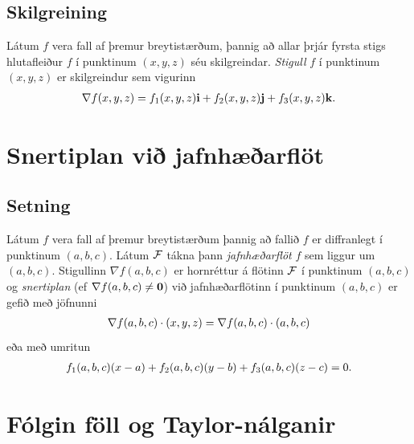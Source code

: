 \documentclass[a4paper,10pt,icelandic]{sphinxmanual}
\begin{document}
\subsection{Skilgreining}
\label{Kafli2:id51}
Látum \(f\) vera fall af þremur breytistærðum, þannig að allar þrjár
fyrsta stigs hlutafleiður \(f\) í punktinum \((x,y,z)\) séu
skilgreindar. \textit{Stigull} \(f\) í punktinum \((x,y,z)\) er
skilgreindur sem vigurinn
\begin{gather}
\begin{split}\displaystyle \nabla f(x,y,z)=f_1(x,y,z)\mbox{${\bf i}$}+f_2(x,y,z)\mbox{${\bf j}$}+f_3(x,y,z)\mbox{${\bf k}$}.\end{split}\notag
\end{gather}

\section{Snertiplan við jafnhæðarflöt}
\label{Kafli2:snertiplan-vi-jafnhaearflot}\label{Kafli2:index-24}

\subsection{Setning}
\label{Kafli2:id52}
Látum \(f\) vera fall af þremur breytistærðum þannig að fallið
\(f\) er diffranlegt í punktinum \((a,b,c)\). Látum
\(\cal F\) tákna þann \textit{jafnhæðarflöt} \(f\) sem liggur um
\((a,b,c)\). Stigullinn \(\nabla f(a,b,c)\) er hornréttur á
flötinn \(\cal F\) í punktinum \((a,b,c)\) og \textit{snertiplan} (ef
\(\nabla f(a,b,c)\neq\mbox{${\bf 0}$}\)) við jafnhæðarflötinn í
punktinum \((a,b,c)\) er gefið með jöfnunni
\begin{gather}
\begin{split}\displaystyle \nabla f(a,b,c)\cdot(x,y,z)=\nabla f(a,b,c)\cdot(a,b,c)\end{split}\notag
\end{gather}
eða með umritun
\begin{gather}
\begin{split}\displaystyle f_1(a,b,c)(x-a)+f_2(a,b,c)(y-b)+f_3(a,b,c)(z-c)=0.\end{split}\notag
\end{gather}

\section{Fólgin föll og Taylor-nálganir}
\label{Kafli2:folgin-foll-og-taylor-nalganir}
\end{document}
